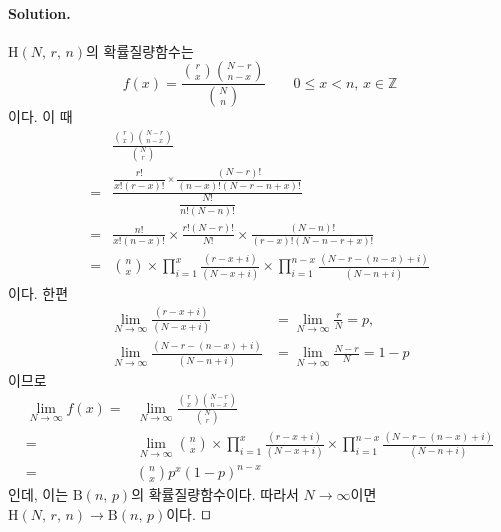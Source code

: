 \paragraph{Solution.} $\mathrm{H}\left(N,\,r,\,n\right)$의 확률질량함수는
\[f\left(x\right) = \frac{\displaystyle \binom{r}{x} \binom{N-r}{n-x}}{\displaystyle \binom{N}{n}} \qquad 0 \leq x < n,\, x \in \mathbb{Z}\]
이다. 이 때
\begin{align*}
    & \frac{\displaystyle \binom{r}{x} \binom{N-r}{n-x}}{\displaystyle \binom{N}{r}}\\
    =& \frac{\dfrac{r!}{x!\left(r - x\right)!}\times\dfrac{\left(N - r\right)!}{\left(n - x\right)!\left(N - r - n + x\right)!}}{\dfrac{N!}{n!\left(N - n\right)!}}\\
    =& \frac{n!}{x!\left(n - x\right)!}\times\frac{r!\left(N - r\right)!}{N!}\times\frac{\left(N - n\right)!}{\left(r - x\right)!\left(N - n - r + x\right)!}\\
    =& \binom{n}{x} \times \prod_{i=1}^x \frac{(r-x+i)}{(N-x+i)} \times \prod_{i=1}^{n-x}\frac{(N-r-(n-x)+i)}{(N-n+i) }
\end{align*}
이다. 한편
\begin{align*}
    \lim_{N\rightarrow\infty} \frac{(r-x+i)}{(N-x+i)} &= \lim_{N\rightarrow\infty} \frac{r}{N} = p,\\
    \lim_{N\rightarrow\infty} \frac{(N-r-(n-x)+i)}{(N-n+i) } &= \lim_{N\rightarrow\infty} \frac{N-r}{N} = 1-p
\end{align*}
이므로
\begin{align*}
    \lim_{N\rightarrow\infty}  f\left(x\right) =&\lim_{N\rightarrow\infty} \frac{\displaystyle \binom{r}{x} \binom{N-r}{n-x}}{\displaystyle \binom{N}{r}}\\
    =& \lim_{N\rightarrow\infty} \binom{n}{x} \times \prod_{i=1}^x \frac{(r-x+i)}{(N-x+i)} \times \prod_{i=1}^{n-x}\frac{(N-r-(n-x)+i)}{(N-n+i) }\\
    =& \binom{n}{x} p^{x} \left(1-p\right)^{n-x}
\end{align*}
인데, 이는 $\mathrm{B}\left(n,\,p\right)$의 확률질량함수이다. 따라서 $N \rightarrow \infty$이면
$\mathrm{H}\left(N,\,r,\,n\right) \rightarrow \mathrm{B}\left(n,\,p\right)$이다. $\qed$